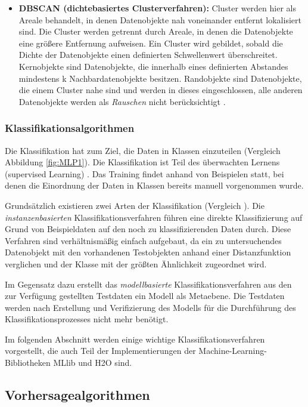 \begin{itemize}
		\item \textbf{DBSCAN (dichtebasiertes Clusterverfahren):} Cluster werden hier als Areale behandelt, in denen Datenobjekte nah voneinander entfernt lokalisiert sind. Die Cluster werden getrennt durch Areale, in denen die Datenobjekte eine größere Entfernung aufweisen. Ein Cluster wird gebildet, sobald die Dichte der Datenobjekte einen definierten Schwellenwert überschreitet. Kernobjekte sind Datenobjekte, die innerhalb eines definierten Abstandes mindestens k Nachbardatenobjekte besitzen. Randobjekte sind Datenobjekte, die einem Cluster nahe sind und werden in dieses eingeschlossen, alle anderen Datenobjekte werden als \textit{Rauschen} nicht berücksichtigt .
\end{itemize}	

\subsubsection{Klassifikationsalgorithmen}
\label{section:klassifikationsalgorithmen}

Die Klassifikation hat zum Ziel, die Daten in Klassen einzuteilen (Vergleich Abbildung \ref{fig:MLP1}). Die Klassifikation ist Teil des überwachten Lernens (supervised Learning) . Das Training findet anhand von Beispielen statt, bei denen die Einordnung der Daten in Klassen bereits manuell vorgenommen wurde.  

Grundsätzlich existieren zwei Arten der Klassifikation (Vergleich ). Die \textit{instanzenbasierten} Klassifikationsverfahren führen eine direkte Klassifizierung auf Grund von Beispieldaten auf den noch zu klassifizierenden Daten durch. Diese Verfahren sind verhältnismäßig einfach aufgebaut, da ein zu untersuchendes Datenobjekt mit den vorhandenen Testobjekten anhand einer Distanzfunktion verglichen und der Klasse mit der größten Ähnlichkeit zugeordnet wird. 

Im Gegensatz dazu erstellt das \textit{modellbasierte} Klassifikationsverfahren aus den zur Verfügung gestellten Testdaten ein Modell als Metaebene. Die Testdaten werden nach Erstellung und Verifizierung des Modells für die Durchführung des Klassifikationsprozesses nicht mehr benötigt.  

Im folgenden Abschnitt werden einige wichtige Klassifikationsverfahren vorgestellt, die auch Teil der Implementierungen der Machine-Learning-Bibliotheken MLlib und H2O sind.

\subsection{Vorhersagealgorithmen}
\label{section:vorhersagealgorithmen}

